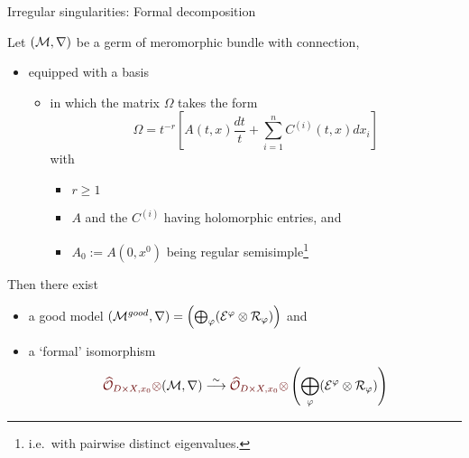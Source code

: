 \begin{frame}[t]{Irregular singularities: Formal decomposition}
  \begin{thm}
    Let $(\mathcal{M},\nabla)$ be a germ of meromorphic bundle with connection,
    \begin{itemize}
      \item equipped with a basis 
        \begin{itemize}
          \item 
            in which the matrix $\Omega$ takes the form
            \[
              \Omega=t^{-r}\left[A(t,x)\frac{dt}{t}
                +\sum_{i=1}^nC^{(i)}(t,x)dx_i\right]
            \]
          with
          \begin{itemize}
            \item $r\geq1$
            \item $A$ and the $C^{(i)}$ having holomorphic entries, and
            \item $A_0:=A(0,x^0)$ being regular semisimple\footnote{i.e.\ with
              pairwise distinct eigenvalues.}
          \end{itemize}
        \end{itemize}
    \end{itemize}
    Then there exist
    \begin{itemize}
      \item a good model $(\mathcal{M}^{good},\nabla)
        =\left(\bigoplus_\varphi(\mathcal{E}^\varphi\otimes\mathcal{R}_\varphi) \right)$ and
      \item a \textcolor{red!40!black}{`formal'} isomorphism
        \[
          \textcolor{red!40!black}{\hat\cO_{D\times X,x_0}\otimes}(\cM,\nabla)
          \overset{\sim}{\longrightarrow}
        \textcolor{red!40!black}{\hat\cO_{D\times X,x_0}\otimes}
          \left(\bigoplus_\phi(\cE^\phi\otimes\cR_\phi) \right)
        \]
    \end{itemize}
  \end{thm}
\end{frame}

